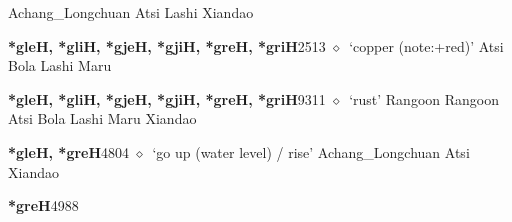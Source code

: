 \begin{list}{}{\leftmargin=1.5em \itemindent=-1.5em}
\hspace{1ex}
         Achang\_Longchuan 
\hspace{1ex}
         Atsi 
\hspace{1ex}
         Lashi 
\hspace{1ex}
         Xiandao 
  \item {\footnotesize \textbf{*gleH, *gliH, *gjeH, *gjiH, *greH, *griH}}{\tiny 2513}
\hspace{1ex}
         $\diamond$~`copper (note:+red)'
         Atsi 
\hspace{1ex}
         Bola 
\hspace{1ex}
         Lashi 
\hspace{1ex}
         Maru 
  \item {\footnotesize \textbf{*gleH, *gliH, *gjeH, *gjiH, *greH, *griH}}{\tiny 9311}
\hspace{1ex}
         $\diamond$~`rust'
         Rangoon 
\hspace{1ex}
         Rangoon 
\hspace{1ex}
         Atsi 
\hspace{1ex}
         Bola 
\hspace{1ex}
         Lashi 
\hspace{1ex}
         Maru 
\hspace{1ex}
         Xiandao 
  \item {\footnotesize \textbf{*gleH, *greH}}{\tiny 4804}
\hspace{1ex}
         $\diamond$~`go up (water level) / rise'
         Achang\_Longchuan 
\hspace{1ex}
         Atsi 
\hspace{1ex}
         Xiandao 
  \item {\footnotesize \textbf{*greH}}{\tiny 4988}
\hspace{1ex}

\end{list}
